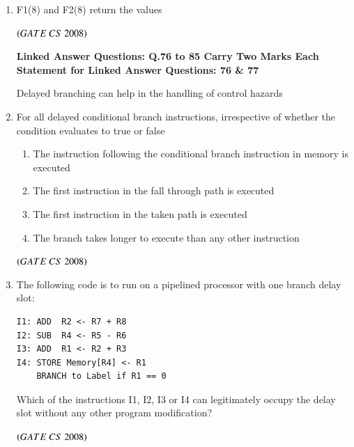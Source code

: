 \documentclass[journal]{IEEEtran}
\numberwithin{equation}{enumi}
\numberwithin{figure}{enumi}
\begin{document}
\begin{enumerate}
\item F1(8) and F2(8) return the values 
\begin{enumerate}
\end{enumerate}
\hfill $\left(GATE\ CS\  2008\right)$

\begin{center}
\textbf{Linked Answer Questions: Q.76 to 85 Carry Two Marks Each}\\
 
\textbf{Statement for Linked Answer Questions: 76 \& 77}
\end{center}
Delayed branching can help in the handling of control hazards  

\item For all delayed conditional branch instructions, irrespective of whether the condition evaluates to true or false  
\begin{enumerate}
   \item The instruction following the conditional branch instruction in memory is executed  
   \item The first instruction in the fall through path is executed  
   \item The first instruction in the taken path is executed  
   \item The branch takes longer to execute than any other instruction  
\end{enumerate}
 
\hfill $\left(GATE\ CS\  2008\right)$

\item The following code is to run on a pipelined processor with one branch delay slot:  

\begin{verbatim}
I1: ADD  R2 <- R7 + R8
I2: SUB  R4 <- R5 - R6
I3: ADD  R1 <- R2 + R3
I4: STORE Memory[R4] <- R1
    BRANCH to Label if R1 == 0
\end{verbatim}

Which of the instructions I1, I2, I3 or I4 can legitimately occupy the delay slot without any other program modification?
\begin{enumerate} 
\end{enumerate}
\hfill $\left(GATE\ CS\  2008\right)$


\end{enumerate}
\end{document}

